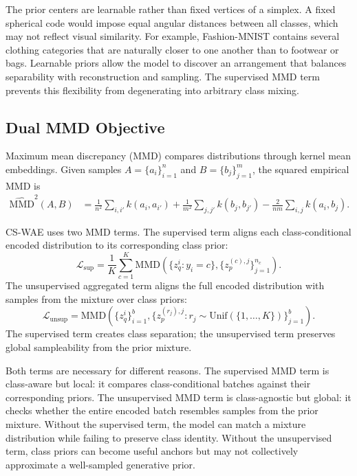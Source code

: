 \documentclass[10pt]{article}
\begin{document}
The prior centers are learnable rather than fixed vertices of a simplex. A fixed spherical code would impose equal angular distances between all classes, which may not reflect visual similarity. For example, Fashion-MNIST contains several clothing categories that are naturally closer to one another than to footwear or bags. Learnable priors allow the model to discover an arrangement that balances separability with reconstruction and sampling. The supervised MMD term prevents this flexibility from degenerating into arbitrary class mixing.

\subsection{Dual MMD Objective}

Maximum mean discrepancy (MMD) \citep{gretton2012kernel} compares distributions through kernel mean embeddings. Given samples $A=\{a_i\}_{i=1}^{n}$ and $B=\{b_j\}_{j=1}^{m}$, the squared empirical MMD is
\begin{align}
    \widehat{\mathrm{MMD}}^2(A,B)
    &= \frac{1}{n^2}\sum_{i,i'} k(a_i,a_{i'})
    + \frac{1}{m^2}\sum_{j,j'} k(b_j,b_{j'})
    - \frac{2}{nm}\sum_{i,j} k(a_i,b_j).
\end{align}

CS-WAE uses two MMD terms. The supervised term aligns each class-conditional encoded distribution to its corresponding class prior:
\begin{equation}
    \mathcal{L}_{\mathrm{sup}}
    =
    \frac{1}{K}\sum_{c=1}^{K}
    \mathrm{MMD}\left(
        \{z_q^i: y_i=c\},
        \{z_p^{(c),j}\}_{j=1}^{n_c}
    \right).
\end{equation}
The unsupervised aggregated term aligns the full encoded distribution with samples from the mixture over class priors:
\begin{equation}
    \mathcal{L}_{\mathrm{unsup}}
    =
    \mathrm{MMD}\left(
        \{z_q^i\}_{i=1}^{b},
        \{z_p^{(r_j),j}: r_j\sim\mathrm{Unif}(\{1,\dots,K\})\}_{j=1}^{b}
    \right).
\end{equation}
The supervised term creates class separation; the unsupervised term preserves global sampleability from the prior mixture.

Both terms are necessary for different reasons. The supervised MMD term is class-aware but local: it compares class-conditional batches against their corresponding priors. The unsupervised MMD term is class-agnostic but global: it checks whether the entire encoded batch resembles samples from the prior mixture. Without the supervised term, the model can match a mixture distribution while failing to preserve class identity. Without the unsupervised term, class priors can become useful anchors but may not collectively approximate a well-sampled generative prior.
\end{document}
